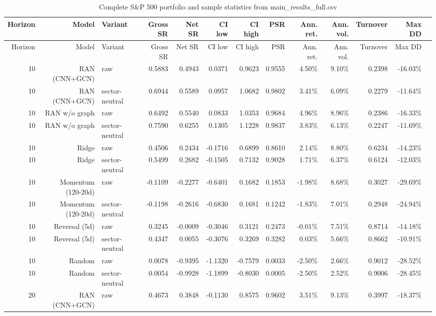 \documentclass[10pt]{article}
\begin{document}
\begingroup\scriptsize\setlength{\tabcolsep}{2.5pt}
\begin{longtable}{rrlrrrrrrrrrr}
\caption{Complete S\&P 500 portfolio and sample statistics from main\_results\_full.csv}\label{tab:sp500port}\\
\toprule
Horizon & Model & Variant & Gross SR & Net SR & CI low & CI high & PSR & Ann. ret. & Ann. vol. & Turnover & Max DD\\
\midrule
\endfirsthead
\toprule
Horizon & Model & Variant & Gross SR & Net SR & CI low & CI high & PSR & Ann. ret. & Ann. vol. & Turnover & Max DD\\
\midrule
\endhead
10 & RAN (CNN+GCN) & raw & 0.5883 & 0.4943 & 0.0371 & 0.9623 & 0.9555 & 4.50\% & 9.10\% & 0.2398 & -16.03\% \\
10 & RAN (CNN+GCN) & sector-neutral & 0.6944 & 0.5589 & 0.0957 & 1.0682 & 0.9802 & 3.41\% & 6.09\% & 0.2279 & -11.64\% \\
10 & RAN w/o graph & raw & 0.6492 & 0.5540 & 0.0833 & 1.0353 & 0.9684 & 4.96\% & 8.96\% & 0.2386 & -16.33\% \\
10 & RAN w/o graph & sector-neutral & 0.7590 & 0.6255 & 0.1305 & 1.1228 & 0.9837 & 3.83\% & 6.13\% & 0.2247 & -11.69\% \\
10 & Ridge & raw & 0.4506 & 0.2434 & -0.1716 & 0.6899 & 0.8610 & 2.14\% & 8.80\% & 0.6234 & -14.23\% \\
10 & Ridge & sector-neutral & 0.5499 & 0.2682 & -0.1505 & 0.7132 & 0.9028 & 1.71\% & 6.37\% & 0.6124 & -12.03\% \\
10 & Momentum (120-20d) & raw & -0.1109 & -0.2277 & -0.6401 & 0.1682 & 0.1853 & -1.98\% & 8.68\% & 0.3027 & -29.69\% \\
10 & Momentum (120-20d) & sector-neutral & -0.1198 & -0.2616 & -0.6830 & 0.1681 & 0.1242 & -1.83\% & 7.01\% & 0.2948 & -24.94\% \\
10 & Reversal (5d) & raw & 0.3245 & -0.0009 & -0.3046 & 0.3121 & 0.2473 & -0.01\% & 7.51\% & 0.8714 & -14.18\% \\
10 & Reversal (5d) & sector-neutral & 0.4347 & 0.0055 & -0.3076 & 0.3269 & 0.3282 & 0.03\% & 5.66\% & 0.8662 & -10.91\% \\
10 & Random & raw & 0.0078 & -0.9395 & -1.1320 & -0.7579 & 0.0033 & -2.50\% & 2.66\% & 0.9012 & -28.52\% \\
10 & Random & sector-neutral & 0.0054 & -0.9928 & -1.1899 & -0.8030 & 0.0005 & -2.50\% & 2.52\% & 0.9006 & -28.45\% \\
20 & RAN (CNN+GCN) & raw & 0.4673 & 0.3848 & -0.1130 & 0.8575 & 0.9602 & 3.51\% & 9.13\% & 0.3997 & -18.37\% \\

\end{longtable}
\end{document}
